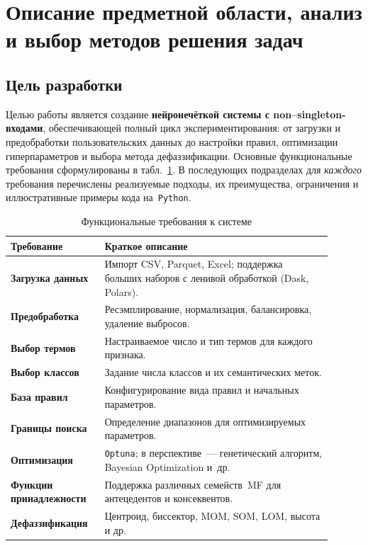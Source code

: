 \section{Описание предметной области, анализ и выбор методов решения задач}
\label{sec:software_design}

\subsection{Цель разработки}
\label{subsec:goal}

Целью работы является создание \textbf{нейронечёткой системы с non--singleton-входами}, обеспечивающей полный цикл экспериментирования: от загрузки и предобработки пользовательских данных до настройки правил, оптимизации гиперпараметров и выбора метода дефаззификации.  
Основные функциональные требования сформулированы в табл.~\ref{tab:req}. В последующих подразделах для \emph{каждого} требования перечислены реализуемые подходы, их преимущества, ограничения и иллюстративные примеры кода на~\texttt{Python}.

\begin{table}[h]
\centering\small
\caption{Функциональные требования к системе}
\label{tab:req}
\begin{tabular}{p{0.25\linewidth}p{0.65\linewidth}}
\toprule
Требование & Краткое описание \\
\midrule
\textbf{Загрузка данных} & Импорт CSV, Parquet, Excel; поддержка больших наборов с ленивой обработкой (Dask, Polars).\\
\textbf{Предобработка} & Ресэмплирование, нормализация, балансировка, удаление выбросов.\\
\textbf{Выбор термов} & Настраиваемое число и тип термов для каждого признака.\\
\textbf{Выбор классов} & Задание числа классов и их семантических меток.\\
\textbf{База правил} & Конфигурирование вида правил и начальных параметров.\\
\textbf{Границы поиска} & Определение диапазонов для оптимизируемых параметров.\\
\textbf{Оптимизация} & \texttt{Optuna}; в перспективе~--- генетический алгоритм, Bayesian Optimization и~др.\\
\textbf{Функции принадлежности} & Поддержка различных семейств~MF для антецедентов и консеквентов.\\
\textbf{Дефаззификация} & Центроид, биссектор, MOM, SOM, LOM, высота и др. \\
\bottomrule
\end{tabular}
\end{table}

